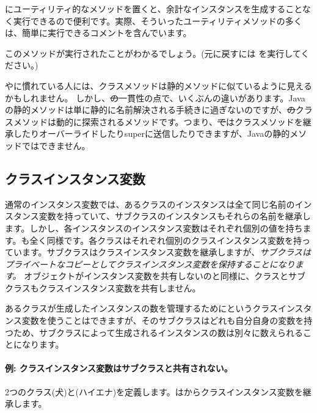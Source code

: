 \documentclass[a4paper,10pt,twoside]{book}
\begin{document}
にユーティリティ的なメソッドを置くと、余計なインスタンスを生成することなく実行できるので便利です。実際、そういったユーティリティメソッドの多くは、簡単に実行できるコメントを含んでいます。


このメソッドが実行されたことがわかるでしょう。(元に戻すには を実行してください。)

やに慣れている人には、クラスメソッドは静的メソッドに似ているように見えるかもしれません。
しかし、\st の一貫性の点で、いくぶんの違いがあります。Javaの静的メソッドは単に静的に名前解決される手続きに過ぎないのですが、\st のクラスメソッドは動的に探索されるメソッドです。つまり、\st ではクラスメソッドを継承したりオーバーライドしたりsuperに送信したりできますが、Javaの静的メソッドではできません。

\subsection{クラスインスタンス変数}
通常のインスタンス変数では、あるクラスのインスタンスは全て同じ名前のインスタンス変数を持っていて、サブクラスのインスタンスもそれらの名前を継承します。しかし、各インスタンスのインスタンス変数はそれぞれ個別の値を持ちます。も全く同様です。各クラスはそれぞれ個別のクラスインスタンス変数を持っています。サブクラスはクラスインスタンス変数を継承しますが、\emph{サブクラスはプライベートなコピーとしてクラスインスタンス変数を保持することになります。} オブジェクトがインスタンス変数を共有しないのと同様に、クラスとサブクラスもクラスインスタンス変数を共有しません。

あるクラスが生成したインスタンスの数を管理するためにというクラスインスタンス変数を使うことはできますが、そのサブクラスはどれも自分自身の変数を持つため、サブクラスによって生成されるインスタンスの数は別々に数えられることになります。

\paragraph{例: クラスインスタンス変数はサブクラスと共有されない。}
2つのクラス(犬)と(ハイエナ)を定義します。はからクラスインスタンス変数を継承します。
\end{document}
